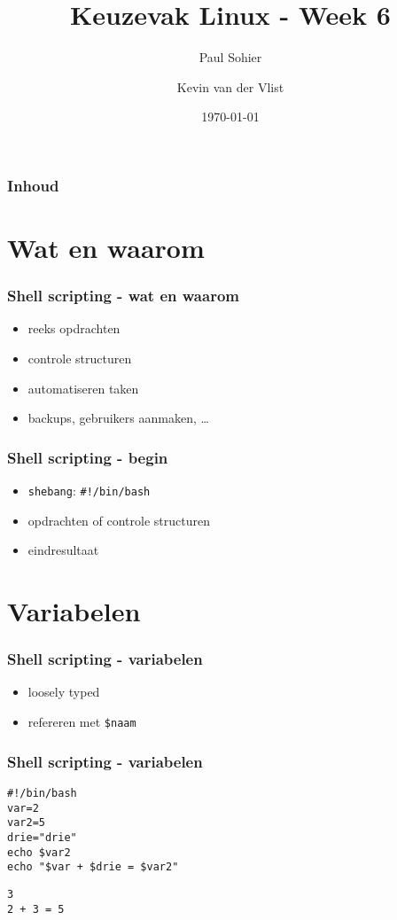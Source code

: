\documentclass{beamer}
\title{Keuzevak Linux - Week 6}
\author{Paul Sohier \and Kevin van der Vlist}
\institute{Versie $1.0$}
\date{\today}
\begin{document}
\begin{frame}
  \titlepage
\end{frame} 

\begin{frame}
  \frametitle{Inhoud}
  \tableofcontents
\end{frame}

\section{Wat en waarom}

\begin{frame}
  \frametitle{Shell scripting - wat en waarom}
  \begin{itemize}
  \item<1-> reeks opdrachten
  \item<2-> controle structuren
  \item<3-> automatiseren taken
  \item<4-> backups, gebruikers aanmaken, \ldots
  \end{itemize}
\end{frame}

\begin{frame}
  \frametitle{Shell scripting - begin}
  \begin{itemize}
  \item<1-> \texttt{shebang}: \texttt{\#!/bin/bash}
  \item<2-> opdrachten of controle structuren
  \item<3-> eindresultaat
  \end{itemize}
\end{frame}

\section{Variabelen}

\begin{frame}
  \frametitle{Shell scripting - variabelen}
  \begin{itemize}
  \item<1-> loosely typed
  \item<2-> refereren met \texttt{\$naam}%
  \end{itemize}
\end{frame}

\begin{frame}[fragile]
  \frametitle{Shell scripting - variabelen}
  \begin{lstlisting}
#!/bin/bash
var=2
var2=5
drie="drie"
echo $var2
echo "$var + $drie = $var2"
  \end{lstlisting}
  \begin{lstlisting}
3
2 + 3 = 5
  \end{lstlisting}
\end{frame}
\end{document}

